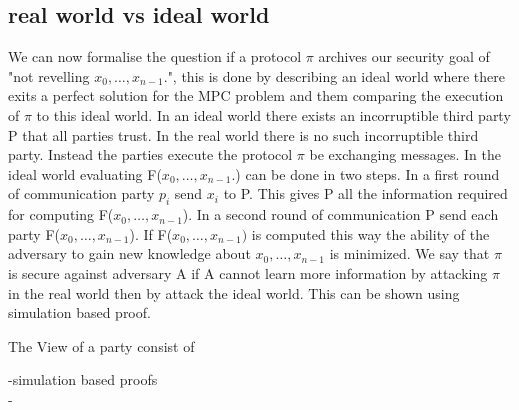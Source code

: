 \subsection{real world vs ideal world }
We can now formalise the question if a protocol $ \pi $ archives our security goal of "not revelling $ x_0,\dots,x_{n-1}. $", this is done by describing an ideal world where there exits a perfect solution for the MPC problem and them comparing the execution of $ \pi $ to this ideal world. In an ideal world there exists an incorruptible third party P that all parties trust. In the real world there is no such incorruptible third party. Instead the parties execute the protocol $ \pi $ be exchanging messages.
In the ideal world evaluating F($ x_0,\dots,x_{n-1}. $) can be done in two steps. In a first round of communication party $ p_i $ send $x_i $ to P.
This gives P all the information required for computing F($ x_0,\dots,x_{n-1} $). In a second round of communication P send each party F($ x_0,\dots,x_{n-1} $).
If F($ x_0,\dots,x_{n-1}) $ is computed this way the ability of the adversary to gain new knowledge about $ x_0,\dots,x_{n-1} $ is minimized. We say that  $ \pi $ is secure against adversary A if A cannot learn more information by attacking $ \pi $ in the real world then by attack the ideal world. This can be shown using simulation based proof. 

The View of a party consist of     
      


   


-simulation based proofs \\
-   
